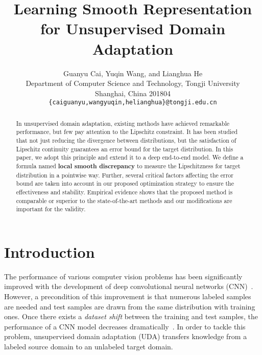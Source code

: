 \documentclass[10pt,twocolumn,letterpaper]{article}
\begin{document}
\title{Learning Smooth Representation for Unsupervised Domain Adaptation}

\author{Guanyu Cai, Yuqin Wang, and Lianghua He\\
Department of Computer Science and Technology, Tongji University\\
Shanghai, China 201804\\
{\tt\small \{caiguanyu,wangyuqin,helianghua\}@tongji.edu.cn}
}

\maketitle


\begin{abstract}
In unsupervised domain adaptation, existing methods have achieved remarkable performance, but few pay attention to the Lipschitz constraint. It has been studied that not just reducing the divergence between distributions, but the satisfaction of Lipschitz continuity guarantees an error bound for the target distribution. In this paper, we adopt this principle and extend it to a deep end-to-end model. We define a formula named \textbf {local smooth discrepancy} to measure the Lipschitzness for target distribution in a pointwise way. Further, several critical factors affecting the error bound are taken into account in our proposed optimization strategy to ensure the effectiveness and stability. Empirical evidence shows that the proposed method is comparable or superior to the state-of-the-art methods and our modifications are important for the validity. 
\end{abstract}



\section{Introduction}
\label{introduction}

The performance of various computer vision problems has been significantly improved with the development of deep convolutional neural networks (CNN)~\cite{krizhevsky2012imagenet}. However, a precondition of this improvement is that numerous labeled samples are needed and test samples are drawn from the same distribution with training ones. Once there exists a \emph{dataset shift} between the training and test samples, the performance of a CNN model decreases dramatically~\cite{ben2010theory,donahue2014decaf:}. In order to tackle this problem, unsupervised domain adaptation (UDA) transfers knowledge from a labeled source domain to an unlabeled target domain.
\end{document}
